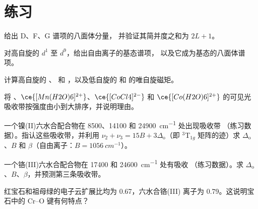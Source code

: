 \section{练习}

\begin{exercise}[$\star$]\label{exo:b3:complex-spectra-magnetism:1}
给出 D、F、G 谱项的八面体分量，
并验证其简并度之和为 $2L + 1$。
\end{exercise}

\begin{exercise}[$\star$]\label{exo:b3:complex-spectra-magnetism:2}
对高自旋的 $d^1$ 至 $d^9$，给出自由离子的基态谱项，
以及它成为基态的八面体谱项。
\end{exercise}

\begin{exercise}[$\star$]\label{exo:b3:complex-spectra-magnetism:3}
计算高自旋的 、 和 ，以及低自旋的
 和  的唯自旋磁矩。
\end{exercise}

\begin{exercise}[$\star$]\label{exo:b3:complex-spectra-magnetism:4}
将 、$\ce{[Mn(H2O)6]^{2+}}$、$\ce{[CoCl4]^{2-}}$ 和
$\ce{[Co(H2O)6]^{2+}}$ 的可见光吸收带按强度由小到大排序，并说明理由。
\end{exercise}

\begin{exercise}[$\star\star$]\label{exo:b3:complex-spectra-magnetism:5}
一个镍(II)六水合配合物在 8500、14100 和 \qty{24900}{cm^{-1}} 处出现吸收带
（练习数据）。指认这些吸收带，并利用
$\nu_2 + \nu_3 = 15B + 3\Delta_{\mathrm o}$（即 $^3$T$_{1g}$ 矩阵的迹）求 $\Delta_{\mathrm o}$、$B$ 和 $\beta$（自由离子：$B = \qty{1056}{cm^{-1}}$）。
\end{exercise}

\begin{exercise}[$\star\star$]\label{exo:b3:complex-spectra-magnetism:6}
一个铬(III)六水合配合物在 17400 和 \qty{24600}{cm^{-1}} 处有吸收
（练习数据）。求 $\Delta_{\mathrm o}$、$B$、$\beta$，并预测第三条吸收带。
\end{exercise}

\begin{exercise}[$\star\star$]\label{exo:b3:complex-spectra-magnetism:7}
红宝石和祖母绿的电子云扩展比均为 0.67，六水合铬(III)
离子为 0.79。这说明宝石中的 Cr--O 键有何特点？
\end{exercise}

